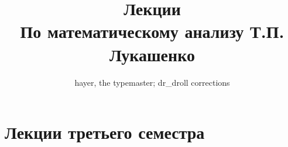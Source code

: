 \documentclass[10dd, oneside, a4paper]{book}
\theoremstyle{plain}%
\theoremstyle{definition}
\theoremstyle{remark}
\begin{document}
\begin{titlepage}
\author{hayer, the typemaster; dr\_droll corrections}
\title{Лекции\\ По математическому анализу Т.П. Лукашенко}
\maketitle
\end{titlepage}
\setcounter{part}{2}
\part{Лекции третьего семестра}
\setcounter{chapter}{0}





\end{document}
